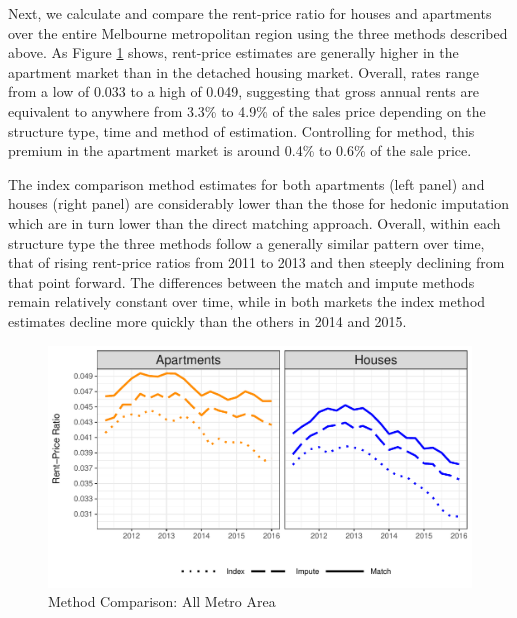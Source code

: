 \documentclass{article}\usepackage[]{graphicx}\usepackage[]{color}
\makeatletter
\def\maxwidth{ %
  \ifdim\Gin@nat@width>\linewidth
    \linewidth
  \else
    \Gin@nat@width
  \fi
}
\makeatother
\begin{document}
Next, we calculate and compare the rent-price ratio for houses and apartments over the entire Melbourne metropolitan region using the three methods described above. As Figure \ref{fig:metroplot} shows, rent-price estimates are generally higher in the apartment market than in the detached housing market. Overall, rates range from a low of 0.033 to a high of 0.049, suggesting that gross annual rents are equivalent to anywhere from 3.3\% to 4.9\% of the sales price depending on the structure type, time and method of estimation.  Controlling for method, this premium in the apartment market is around 0.4\% to 0.6\% of the sale price.\par

The index comparison method estimates for both apartments (left panel) and houses (right panel) are considerably lower than the those for hedonic imputation which are in turn lower than the direct matching approach. Overall, within each structure type the three methods follow a generally similar pattern over time, that of rising rent-price ratios from 2011 to 2013 and then steeply declining from that point forward. The differences between the match and impute methods remain relatively constant over time, while in both markets the index method estimates decline more quickly than the others in 2014 and 2015.\par







\begin{figure}
 \centering


\includegraphics[width=\maxwidth]{figure/metro_plot2-1} 


\caption{Method Comparison: All Metro Area}
\label{fig:metroplot}
\end{figure}
\end{document}
